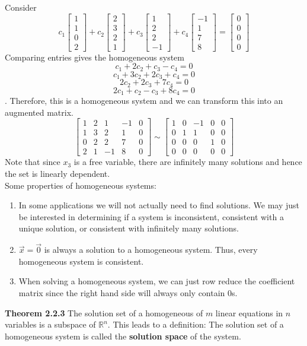 \documentclass[10pt,letter]{article}
\begin{document}
Consider $$c_1\begin{bmatrix}1\\1\\0\\2\end{bmatrix} +c_2\begin{bmatrix}2\\3\\2\\1\end{bmatrix} +c_3\begin{bmatrix}1\\2\\2\\-1\end{bmatrix} +c_4\begin{bmatrix}-1\\1\\7\\8\end{bmatrix}=\begin{bmatrix}0\\0\\0\\0\end{bmatrix}$$ Comparing entries gives the homogeneous system $$c_1+2c_2+c_3-c_4=0$$ $$c_1+3c_2+2c_3+c_4=0$$ $$2c_2+2c_3+7c_4=0$$ $$2c_1+c_2-c_3+8c_4=0$$. Therefore, this is a homogeneous system and we can transform this into an augmented matrix. $$\left[\begin{array}{rrrr|r}
    1 & 2 & 1 & -1 & 0 \\
    1 & 3 & 2 & 1 & 0 \\ 
    0&2&2&7&0\\
    2&1&-1&8&0 
\end{array}\right] \sim \left[\begin{array}{rrrr|r}
    1 & 0 & -1 & 0 & 0 \\
    0 & 1 & 1 & 0 & 0 \\ 
    0& 0 & 0 & 1 & 0 \\
    0 & 0 & 0 & 0 & 0
\end{array}\right]$$
Note that since $x_3$ is a free variable, there are infinitely many solutions and hence the set is linearly dependent. \\ 
Some properties of homogeneous systems: \begin{enumerate}
    \item In some applications we will not actually need to find solutions. We may just be interested in determining if a system is inconsistent, consistent with a unique solution, or consistent with infinitely many solutions. 
    \item $\vec{x}=\vec{0}$ is always a solution to a homogeneous system. Thus, every homogeneous system is consistent. 
    \item When solving a homogeneous system, we can just row reduce the coefficient matrix since the right hand side will always only contain 0s.
\end{enumerate} 
\textbf{Theorem 2.2.3} The solution set of a homogeneous of $m$ linear equations in $n$ variables is a subspace of $\mathbb{R}^n$. This leads to a definition: The solution set of a homogeneous system is called the \textbf{solution space} of the system. 
\end{document}
